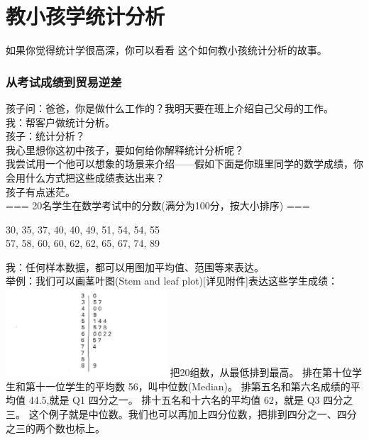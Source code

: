 \chapter{教小孩学统计分析} %

如果你觉得统计学很高深，你可以看看 这个如何教小孩统计分析的故事。


\hypertarget{ux5982ux4f55ux753bux830eux53f6ux56festem-and-leaf-plot}{%
\subsection{从考试成绩到贸易逆差}\label{ux5982ux4f55ux753bux830eux53f6ux56festem-and-leaf-plot}}

孩子问：爸爸，你是做什么工作的？我明天要在班上介绍自己父母的工作。\\
我：帮客户做统计分析。\\
孩子：统计分析？\\
我心里想你这初中孩子，要如何给你解释统计分析呢？\\
我尝试用一个他可以想象的场景来介绍------假如下面是你班里同学的数学成绩，你会用什么方式把这些成绩表达出来？\\
孩子有点迷茫。\\
=== 20名学生在数学考试中的分数(满分为100分，按大小排序) ===

30, 35, 37, 40, 40, 49, 51, 54, 54, 55\\
57, 58, 60, 60, 62, 62, 65, 67, 74, 89

我：任何样本数据，都可以用图加平均值、范围等来表达。\\
举例：我们可以画茎叶图(Stem and leaf
plot){[}详见附件{]}表达这些学生成绩：\\


\includegraphics[width=6cm]{MA_FA2_10.png}
把20组数，从最低排到最高。 排在第十位学生和第十一位学生的平均数
56，叫中位数(Median)。 排第五名和第六名成绩的平均值 44.5,就是 Q1
四分之一。 排十五名和十六名的平均值 62，就是 Q3 四分之三。
这个例子就是中位数。我们也可以再加上四分位数，把排到四分之一、四分之三的两个数也标上。

